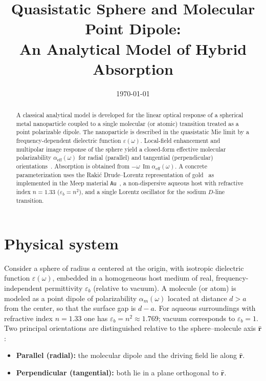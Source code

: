\documentclass[11pt,a4paper]{article}
\title{Quasistatic Sphere and Molecular Point Dipole:\\
\large An Analytical Model of Hybrid Absorption}
\author{}
\date{\today}
\begin{document}
\maketitle

\begin{abstract}
\noindent
A classical analytical model is developed for the linear optical response of a
spherical metal nanoparticle coupled to a single molecular (or atomic)
transition treated as a point polarizable dipole.  The nanoparticle is described
in the quasistatic Mie limit by a frequency-dependent dielectric function
$\varepsilon(\omega)$.  Local-field enhancement and multipolar image response
of the sphere yield a closed-form effective molecular polarizability
$\alpha_{\mathrm{eff}}(\omega)$ for radial (parallel) and tangential
(perpendicular) orientations~\citep{gersten1980,gersten1981,bohren1983}.
Absorption is obtained from $-\omega\,\operatorname{Im}\alpha_{\mathrm{eff}}(\omega)$.
A concrete parameterization uses the Raki\'{c} Drude--Lorentz representation of
gold~\citep{rakic1998} as implemented in the Meep material \texttt{Au}~\citep{oskooi2010},
a non-dispersive aqueous host with refractive index $n=1.33$ ($\varepsilon_b=n^2$),
and a single Lorentz oscillator for the sodium $D$-line transition.
\end{abstract}

\tableofcontents
\newpage

\section{Physical system}
\label{sec:system}

Consider a sphere of radius $a$ centered at the origin, with isotropic dielectric
function $\varepsilon(\omega)$, embedded in a homogeneous host medium of real,
frequency-independent permittivity $\varepsilon_b$ (relative to vacuum).  A
molecule (or atom) is modeled as a point dipole of polarizability
$\alpha_m(\omega)$ located at distance $d>a$ from the center, so that the
surface gap is $d-a$.  For aqueous surroundings with refractive index
$n=1.33$ one has $\varepsilon_b=n^2\approx 1.769$; vacuum corresponds to
$\varepsilon_b=1$.\\

\noindent
Two principal orientations are distinguished relative to the sphere--molecule
axis $\hat{\mathbf{r}}$:
\begin{itemize}[leftmargin=1.4em]
  \item \textbf{Parallel (radial):} the molecular dipole and the driving field
        lie along $\hat{\mathbf{r}}$.
  \item \textbf{Perpendicular (tangential):} both lie in a plane orthogonal to
        $\hat{\mathbf{r}}$.
\end{itemize}
\end{document}
